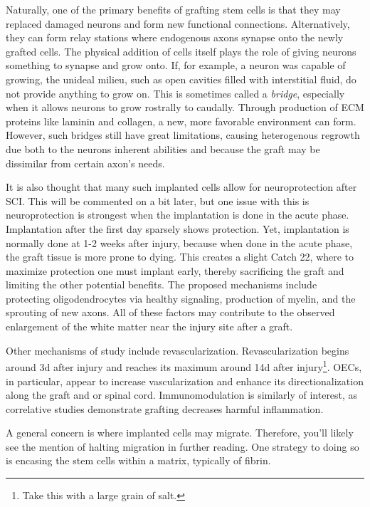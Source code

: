 \documentclass[12pt]{report}
\begin{document}
Naturally, one of the primary benefits of grafting stem cells is that they may replaced damaged neurons and form new functional connections. Alternatively, they can form relay stations where endogenous axons synapse onto the newly grafted cells. The physical addition of cells itself plays the role of giving neurons something to synapse and grow onto. If, for example, a neuron was capable of growing, the unideal milieu, such as open cavities filled with interstitial fluid, do not provide anything to grow on. This is sometimes called  a \textit{bridge}, especially when it allows neurons to grow rostrally to caudally. Through production of ECM proteins like laminin and collagen, a new, more favorable environment can form. However, such bridges still have great limitations, causing heterogenous regrowth due both to the neurons inherent abilities and because the graft may be dissimilar from certain axon's needs.\newline

It is also thought that many such implanted cells allow for neuroprotection after SCI. This will be commented on a bit later, but one issue with this is neuroprotection is strongest when the implantation is done in the acute phase. Implantation after the first day sparsely shows protection. Yet, implantation is normally done at 1-2 weeks after injury, because when done in the acute phase, the graft tissue is more prone to dying. This creates a slight Catch 22, where to maximize protection one must implant early, thereby sacrificing the graft and limiting the other potential benefits. The proposed mechanisms include protecting oligodendrocytes via healthy signaling, production of myelin, and the sprouting of new axons. All of these factors may contribute to the observed enlargement of the white matter near the injury site after a graft.\newline

Other mechanisms of study include revascularization. Revascularization begins around 3d after injury and reaches its maximum around 14d after injury\footnote{Take this with a large grain of salt.}. OECs, in particular, appear to increase vascularization and enhance its directionalization along the graft and or spinal cord. Immunomodulation is similarly of interest, as correlative studies demonstrate grafting decreases harmful inflammation.\newline

A general concern is where implanted cells may migrate. Therefore, you'll likely see the mention of halting migration in further reading. One strategy to doing so is encasing the stem cells within a matrix, typically of fibrin. 
\end{document}
